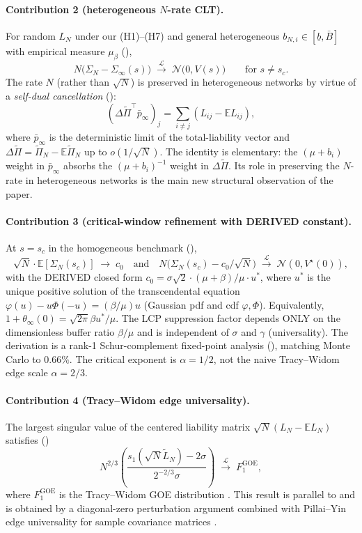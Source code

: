 \documentclass[11pt,a4paper]{article}
\theoremstyle{definition}
\newcommand{\SigmaN}{\Sigma_N}
\newcommand{\SigmaInf}{\Sigma_\infty}
\newcommand{\DPi}{\Delta\widetilde{\Pi}}
\newcommand{\pbarinf}{{\bar p}_{\infty}}
\begin{document}
\paragraph{Contribution 2 (heterogeneous $N$-rate CLT).} For random $L_N$ under
our (H1)--(H7) and general heterogeneous $b_{N,i}\in[\underline b,\bar B]$ with
empirical measure $\mu_\beta$ (),
\[
N\bigl(\SigmaN - \SigmaInf(s)\bigr)\;\xrightarrow{\mathcal L}\;
\mathcal N\!\bigl(0,V(s)\bigr)\qquad\text{for }s\neq s_c.
\]
The rate $N$ (rather than $\sqrt{N}$) is preserved in heterogeneous networks by
virtue of a \emph{self-dual cancellation} ():
\[
(\DPi^\top\pbarinf)_j = \sum_{i\neq j}(L_{ij} - \mathbb E L_{ij}),
\]
where $\pbarinf$ is the deterministic limit of the total-liability vector and
$\DPi = \widetilde\Pi_N - \mathbb E\widetilde\Pi_N$ up to $o(1/\sqrt{N})$.
The identity is elementary: the $(\mu+b_i)$ weight in $\pbarinf$ absorbs the
$(\mu+b_i)^{-1}$ weight in $\DPi$. Its role in preserving the $N$-rate in
heterogeneous networks is the main new structural observation of the paper.

\paragraph{Contribution 3 (critical-window refinement with DERIVED constant).}
At $s = s_c$ in the homogeneous benchmark (),
\[
\sqrt N\cdot\mathbb E[\SigmaN(s_c)]\;\longrightarrow\;c_0
\quad\text{and}\quad
N\bigl(\SigmaN(s_c) - c_0/\sqrt N\bigr)\;\xrightarrow{\mathcal L}\;
\mathcal N(0,V^\star(0)),
\]
with the DERIVED closed form
$c_0 = \sigma\sqrt 2\cdot(\mu+\beta)/\mu\cdot u^\ast$, where $u^\ast$ is the
unique positive solution of the transcendental equation
$\varphi(u) - u\Phi(-u) = (\beta/\mu)u$ (Gaussian pdf and cdf
$\varphi,\Phi$). Equivalently,
$1 + \theta_\infty(0) = \sqrt{2\pi}\beta u^\ast/\mu$. The LCP
suppression factor depends ONLY on the dimensionless buffer ratio $\beta/\mu$
and is independent of $\sigma$ and $\gamma$ (universality). The derivation
is a rank-1 Schur-complement fixed-point analysis
(), matching Monte Carlo to $0.66\%$. The
critical exponent is $\alpha = 1/2$, not the naive Tracy--Widom edge scale
$\alpha = 2/3$.

\paragraph{Contribution 4 (Tracy--Widom edge universality).} The largest
singular value of the centered liability matrix $\sqrt N(L_N - \mathbb E L_N)$
satisfies ()
\[
N^{2/3}\!\left(\frac{s_1(\sqrt N\widetilde L_N) - 2\sigma}{2^{-2/3}\sigma}\right)\;\xrightarrow{\mathcal L}\;F_1^{\text{GOE}},
\]
where $F_1^{\text{GOE}}$ is the Tracy--Widom GOE distribution
\cite{TracyWidom1996}. This result is parallel to  and is
obtained by a diagonal-zero perturbation argument combined with Pillai--Yin
edge universality for sample covariance matrices \cite{PillaiYin2014}.
\end{document}

